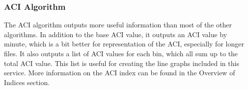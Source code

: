 \subsubsection{ACI Algorithm}
The ACI algorithm outputs more useful information than most of the other algorithms. In addition to the base ACI value, it outputs an ACI value by minute, which is a bit better for representation of the ACI, especially for longer files. It also outputs a list of ACI values for each bin, which all sum up to the total ACI value. This list is useful for creating the line graphs included in this service. More information on the ACI index can be found in the Overview of Indices section.
